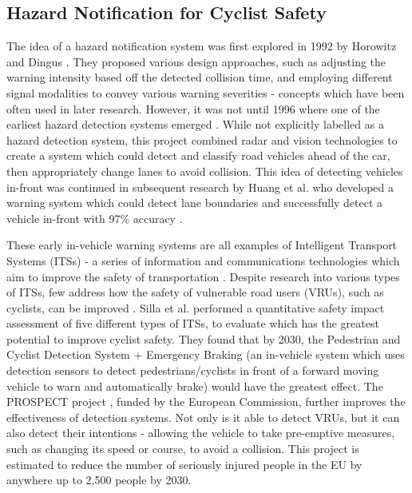 \documentclass{mpaper}
\begin{document}
\subsection{Hazard Notification for Cyclist Safety}
The idea of a hazard notification system was first explored in 1992 by Horowitz and Dingus \cite{doi:10.1177/154193129203601320}. They proposed various design approaches, such as adjusting the warning intensity based off the detected collision time, and employing different signal modalities to convey various warning severities - concepts which have been often used in later research. However, it was not until 1996 where one of the earliest hazard detection systems emerged \cite{566402}. While not explicitly labelled as a hazard detection system, this project combined radar and vision technologies to create a system which could detect and classify road vehicles ahead of the car, then appropriately change lanes to avoid collision. This idea of detecting vehicles in-front was continued in subsequent research by Huang et al. who developed a warning system which could detect lane boundaries and successfully detect a vehicle in-front with 97\% accuracy \cite{1307429}.

These early in-vehicle warning systems are all examples of Intelligent Transport Systems (ITSs) - a series of information and communications technologies which aim to improve the safety of transportation \cite{its}. Despite research into various types of ITSs, few address how the safety of vulnerable road users (VRUs), such as cyclists, can be improved \cite{Scholliers2017}. Silla et al. \cite{SILLA2017134} performed a quantitative safety impact assessment of five different types of ITSs, to evaluate which has the greatest potential to improve cyclist safety. They found that by 2030, the Pedestrian and Cyclist Detection System + Emergency Braking (an in-vehicle system which uses detection sensors to detect pedestrians/cyclists in front of a forward moving vehicle to warn and automatically brake) would have the greatest effect. The PROSPECT project \cite{cieslik2019improving}, funded by the European Commission, further improves the effectiveness of detection systems. Not only is it able to detect VRUs, but it can also detect their intentions - allowing the vehicle to take pre-emptive measures, such as changing its speed or course, to avoid a collision. This project is estimated to reduce the number of seriously injured people in the EU by anywhere up to 2,500 people by 2030.
\end{document}
